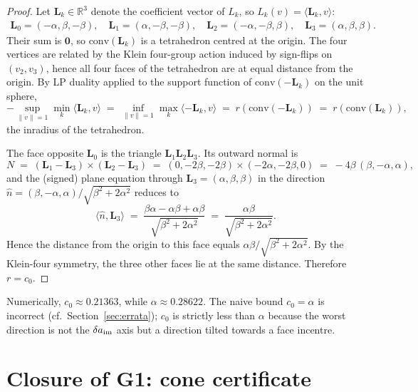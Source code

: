 \documentclass[11pt,a4paper]{article}
\begin{document}
\begin{proof}
Let $\mathbf L_k \in \mathbb{R}^3$ denote the coefficient vector of
$L_k$, so $L_k(v) = \langle \mathbf L_k, v\rangle$:
\begin{align*}
\mathbf L_0 = (-\alpha,\beta,-\beta), \quad
\mathbf L_1 = (\alpha,-\beta,-\beta), \quad
\mathbf L_2 = (-\alpha,-\beta,\beta), \quad
\mathbf L_3 = (\alpha,\beta,\beta).
\end{align*}
Their sum is $\mathbf 0$, so $\mathrm{conv}(\mathbf L_k)$ is a
tetrahedron centred at the origin. The four vertices are related by
the Klein four-group action induced by sign-flips on $(v_2,v_3)$, hence
all four faces of the tetrahedron are at equal distance from the origin.
By LP duality applied to the support function of
$\mathrm{conv}(-\mathbf L_k)$ on the unit sphere,
\[
-\sup_{\|v\|=1} \min_k \langle\mathbf L_k, v\rangle
\;=\;
\inf_{\|v\|=1} \max_k \langle -\mathbf L_k, v\rangle
\;=\;
r(\mathrm{conv}(-\mathbf L_k))
\;=\;
r(\mathrm{conv}(\mathbf L_k)),
\]
the inradius of the tetrahedron.

The face opposite $\mathbf L_0$ is the triangle $\mathbf L_1\mathbf L_2\mathbf L_3$.
Its outward normal is
\[
N \;=\; (\mathbf L_1-\mathbf L_3)\times(\mathbf L_2-\mathbf L_3)
\;=\;(0,-2\beta,-2\beta)\times(-2\alpha,-2\beta,0)
\;=\; -4\beta\,(\beta,-\alpha,\alpha),
\]
and the (signed) plane equation through $\mathbf L_3=(\alpha,\beta,\beta)$
in the direction $\hat n = (\beta,-\alpha,\alpha)/\sqrt{\beta^2+2\alpha^2}$
reduces to
\[
\langle \hat n,\mathbf L_3\rangle
\;=\; \frac{\beta\alpha - \alpha\beta + \alpha\beta}{\sqrt{\beta^2+2\alpha^2}}
\;=\; \frac{\alpha\beta}{\sqrt{\beta^2+2\alpha^2}}.
\]
Hence the distance from the origin to this face equals
$\alpha\beta/\sqrt{\beta^2+2\alpha^2}$.
By the Klein-four symmetry, the three other faces lie at the same
distance. Therefore $r=c_0$.
\end{proof}

Numerically, $c_0 \approx 0.21363$, while $\alpha\approx 0.28622$.
The naive bound $c_0=\alpha$ is incorrect (cf.\ Section~\ref{sec:errata});
$c_0$ is strictly less than $\alpha$ because the worst direction is not
the $\delta a_{\rm im}$ axis but a direction tilted towards a face
incentre.

\section{Closure of G1: cone certificate}
\label{sec:G1}
\end{document}
